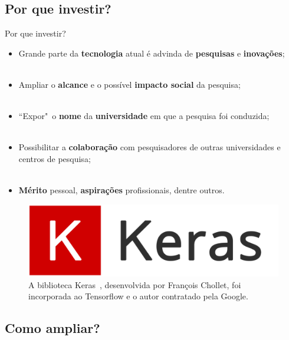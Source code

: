 \subsection{Por que investir?}
\label{ss.why_visibility}

\begin{frame}{Por que investir?}
	\justify 
	\begin{itemize}
		\item<1> Grande parte da \textbf{tecnologia} atual é advinda de \textbf{pesquisas} e \textbf{inovações};
		\\~\\
		\item<2> Ampliar o \textbf{alcance} e o possível \textbf{impacto social} da pesquisa;
		\\~\\
		\item<3> ``Expor"~o \textbf{nome} da \textbf{universidade} em que a pesquisa foi conduzida;
		\\~\\
		\item<4> Possibilitar a \textbf{colaboração} com pesquisadores de outras universidades e centros de pesquisa;
		\\~\\
		\item<5> \textbf{Mérito} pessoal, \textbf{aspirações} profissionais, dentre outros.
	\end{itemize}
\end{frame}

\begin{frame}{}
	\centering
	\begin{figure}
		\includegraphics[scale=0.2]{figs/keras.png}
		\caption{A biblioteca Keras~\cite{Chollet:15}, desenvolvida por François Chollet, foi incorporada ao Tensorflow e o autor contratado pela Google.}
		\label{f.keras}
	\end{figure}
\end{frame}


\subsection{Como ampliar?}
\label{ss.how_visibility}

